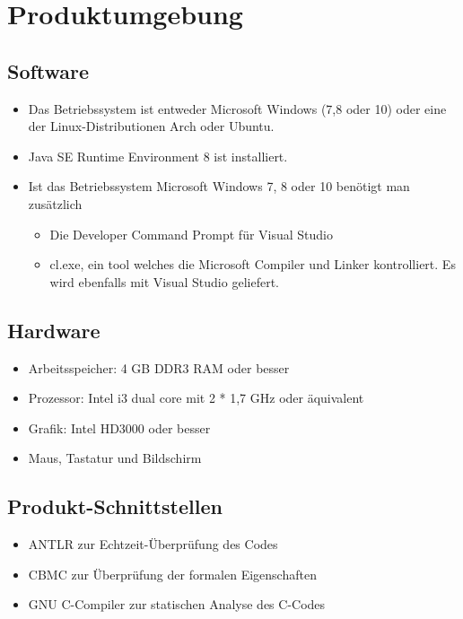 \documentclass[a4paper]{scrreprt}
\begin{document}
\chapter{Produktumgebung}

\section{Software}
\begin{itemize}
\item Das Betriebssystem ist entweder Microsoft Windows (7,8 oder 10) oder eine der Linux-Distributionen Arch oder Ubuntu.
\item Java SE Runtime Environment 8 ist installiert.
\item Ist das Betriebssystem Microsoft Windows 7, 8 oder 10 benötigt man zusätzlich
\begin{itemize}
\item Die Developer Command Prompt für Visual Studio
\item cl.exe, ein tool welches die Microsoft Compiler und Linker kontrolliert. Es wird ebenfalls mit Visual Studio geliefert.
\end{itemize}
\end{itemize}

\section{Hardware}
\begin{itemize}
\item Arbeitsspeicher: 4 GB DDR3 RAM oder besser
\item Prozessor: Intel i3 dual core mit 2 * 1,7 GHz oder äquivalent
\item Grafik: Intel HD3000 oder besser
\item Maus, Tastatur und Bildschirm
\end{itemize}

\section{Produkt-Schnittstellen}
\begin{itemize}
\item ANTLR zur Echtzeit-Überprüfung des Codes
\item CBMC zur Überprüfung der formalen Eigenschaften
\item GNU C-Compiler zur statischen Analyse des C-Codes
\end{itemize}
\end{document}
